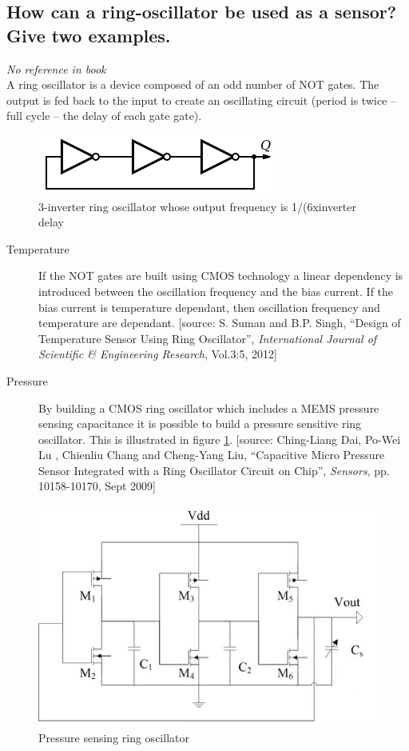 \documentclass[10pt,a4paper]{article}
\begin{document}
\subsection{How can a ring-oscillator be used as a sensor? Give two examples.}

\textit{No reference in book}\\

A ring oscillator is a device composed of an odd number of NOT gates. The output is fed back to the input to create an oscillating circuit (period is twice -- full cycle -- the delay of each gate gate).

\begin{figure}[h!]
    \centering
    \includegraphics{ring.png}
    \caption{3-inverter ring oscillator whose output frequency is 1/(6xinverter delay}
\end{figure}

\begin{description}
	\item[Temperature] If the NOT gates are built using CMOS technology a linear dependency is introduced between the oscillation frequency and the bias current. If the bias current is temperature dependant, then oscillation frequency and temperature are dependant. [source: S. Suman and B.P. Singh, ``Design of Temperature Sensor Using Ring Oscillator'', \textit{International Journal of Scientific \& Engineering Research}, Vol.3:5, 2012]
	\item[Pressure] By building a CMOS ring oscillator which includes a MEMS pressure sensing capacitance it is possible to build a pressure sensitive ring oscillator. This is illustrated in figure \ref{fig:ring-cap}. [source: Ching-Liang Dai, Po-Wei Lu , Chienliu Chang and Cheng-Yang Liu, ``Capacitive Micro Pressure Sensor Integrated with a Ring Oscillator Circuit on Chip'', \textit{Sensors}, pp. 10158-10170, Sept 2009]
\end{description}

\begin{figure}[h!]
	\centering
	\includegraphics[width=\textwidth]{ring-cap.png}
	\caption{Pressure sensing ring oscillator}
	\label{fig:ring-cap}
\end{figure}
\end{document}
